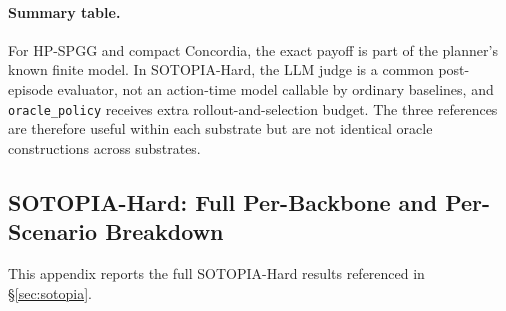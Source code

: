 \paragraph{Summary table.}
\begin{center}
\end{center}

For HP-SPGG and compact Concordia, the exact payoff is part of the planner's known finite model. In SOTOPIA-Hard, the LLM judge is a common post-episode evaluator, not an action-time model callable by ordinary baselines, and \texttt{oracle\_policy} receives extra rollout-and-selection budget. The three references are therefore useful within each substrate but are not identical oracle constructions across substrates.

\subsection{SOTOPIA-Hard: Full Per-Backbone and Per-Scenario Breakdown}
\label{app:sotopia-detail}

This appendix reports the full SOTOPIA-Hard results referenced in \S\ref{sec:sotopia}.

